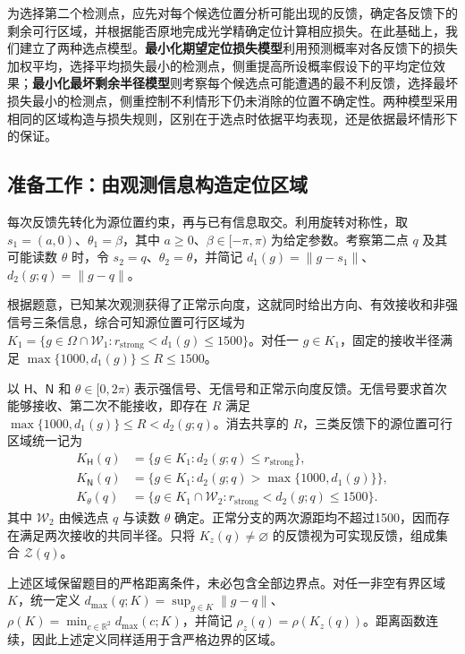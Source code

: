 \documentclass[UTF8,a4paper,zihao=-4,fontset=none]{ctexart}
\begin{document}
为选择第二个检测点，应先对每个候选位置分析可能出现的反馈，确定各反馈下的剩余可行区域，并根据能否原地完成光学精确定位计算相应损失。在此基础上，我们建立了两种选点模型。\textbf{最小化期望定位损失模型}利用预测概率对各反馈下的损失加权平均，选择平均损失最小的检测点，侧重提高所设概率假设下的平均定位效果；\textbf{最小化最坏剩余半径模型}则考察每个候选点可能遭遇的最不利反馈，选择最坏损失最小的检测点，侧重控制不利情形下仍未消除的位置不确定性。两种模型采用相同的区域构造与损失规则，区别在于选点时依据平均表现，还是依据最坏情形下的保证。

\subsection{准备工作：由观测信息构造定位区域}

每次反馈先转化为源位置约束，再与已有信息取交。利用旋转对称性，取 \(s_1=(a,0)\)、\(\theta_1=\beta\)，其中 \(a\ge0\)、\(\beta\in[-\pi,\pi)\) 为给定参数。考察第二点 \(q\) 及其可能读数 \(\theta\) 时，令 \(s_2=q\)、\(\theta_2=\theta\)，并简记 \(d_1(g)=\|g-s_1\|\)、\(d_2(g;q)=\|g-q\|\)。

根据题意，已知某次观测获得了正常示向度，这就同时给出方向、有效接收和非强信号三条信息，综合可知源位置可行区域为 \(K_1=\{g\in\Omega\cap\mathcal W_1:r_{\mathrm{strong}}<d_1(g)\le1500\}\)。对任一 \(g\in K_1\)，固定的接收半径满足 \(\max\{1000,d_1(g)\}\le R\le1500\)。

以 \(\mathsf H\)、\(\mathsf N\) 和 \(\theta\in[0,2\pi)\) 表示强信号、无信号和正常示向度反馈。无信号要求首次能够接收、第二次不能接收，即存在 \(R\) 满足 \(\max\{1000,d_1(g)\}\le R<d_2(g;q)\)。消去共享的 \(R\)，三类反馈下的源位置可行区域统一记为
\begin{equation}
\begin{aligned}
K_{\mathsf H}(q)&=\{g\in K_1:d_2(g;q)\le r_{\mathrm{strong}}\},\\
K_{\mathsf N}(q)&=\{g\in K_1:d_2(g;q)>\max\{1000,d_1(g)\}\},\\
K_\theta(q)&=\{g\in K_1\cap\mathcal W_2:r_{\mathrm{strong}}<d_2(g;q)\le1500\}.
\end{aligned}
\label{eq:q2-pair-regions}
\end{equation}
其中 \(\mathcal W_2\) 由候选点 \(q\) 与读数 \(\theta\) 确定。正常分支的两次源距均不超过1500，因而存在满足两次接收的共同半径。只将 \(K_z(q)\ne\varnothing\) 的反馈视为可实现反馈，组成集合 \(\mathcal Z(q)\)。

上述区域保留题目的严格距离条件，未必包含全部边界点。对任一非空有界区域 \(K\)，统一定义 \(d_{\max}(q;K)=\sup_{g\in K}\|g-q\|\)、\(\rho(K)=\min_{c\in\mathbb R^2}d_{\max}(c;K)\)，并简记 \(\rho_z(q)=\rho(K_z(q))\)。距离函数连续，因此上述定义同样适用于含严格边界的区域。
\end{document}
